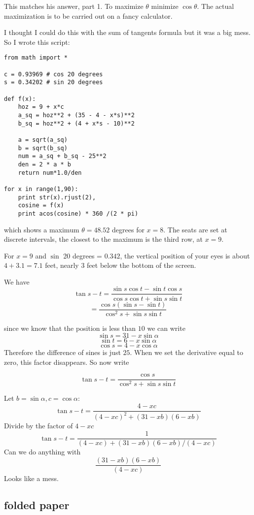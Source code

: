 \documentclass[11pt, oneside]{article}
\begin{document}
This matches his answer, part 1.  To maximize $\theta$ minimize $\cos \theta$.  The actual maximization is to be carried out on a fancy calculator.

I thought I could do this with the sum of tangents formula but it was a big mess.  So I wrote this script:

\begin{verbatim}
from math import *

c = 0.93969 # cos 20 degrees
s = 0.34202 # sin 20 degrees

def f(x):
    hoz = 9 + x*c
    a_sq = hoz**2 + (35 - 4 - x*s)**2
    b_sq = hoz**2 + (4 + x*s - 10)**2
    
    a = sqrt(a_sq)
    b = sqrt(b_sq)
    num = a_sq + b_sq - 25**2
    den = 2 * a * b
    return num*1.0/den

for x in range(1,90):
    print str(x).rjust(2),
    cosine = f(x)
    print acos(cosine) * 360 /(2 * pi)
\end{verbatim}

which shows a maximum $\theta = 48.52$ degrees for $x = 8$.  The seats are set at discrete intervals, the closest to the maximum is the third row, at $x = 9$.

For $x = 9$ and $\sin$ 20 degrees = $0.342$, the vertical position of your eyes is about $4 + 3.1 = 7.1$ feet, nearly $3$ feet below the bottom of the screen.  

We have
\[ \tan s - t = \frac{\sin s \cos t - \sin t \cos s}{\cos s \cos t  + \sin s \sin t} \]
\[ = \frac{\cos s(\sin s - \sin t)}{\cos^2 s + \sin s \sin t} \]

since we know that the position is less than $10$ we can write
\[ \sin s = 31 - x \sin \alpha \]
\[ \sin t = 6 - x \sin \alpha \]
\[ \cos s = 4 - x \cos \alpha \]
Therefore the difference of sines is just $25$.  When we set the derivative equal to zero, this factor disappears.  So now write

\[ \tan s - t = \frac{\cos s}{\cos^2 s + \sin s \sin t} \]

Let $b = \sin \alpha, c = \cos \alpha$:
\[ \tan s - t = \frac{4-xc}{(4 - xc)^2 + (31 - xb)(6 - xb)} \]
Divide by the factor of $4 - xc$ 
\[ \tan s - t = \frac{1}{(4 - xc) + (31 - xb)(6 - xb)/(4 - xc)} \]
Can we do anything with
\[ \frac{(31 - xb)(6 - xb)}{(4 - xc)} \]
Looks like a mess.

\subsection*{folded paper}
\end{document}
